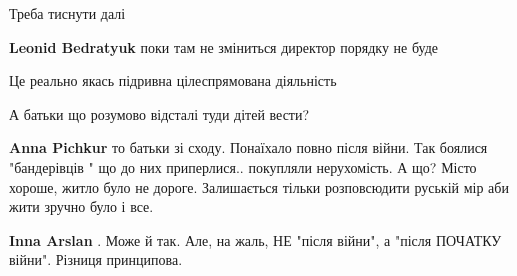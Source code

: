 \begin{itemize}
Треба тиснути далі

\begin{itemize}
 
\textbf{Leonid Bedratyuk} поки там не зміниться директор порядку не буде
\end{itemize}

 
Це реально якась підривна цілеспрямована діяльність

 
А батьки що розумово відсталі туди дітей вести?

\begin{itemize}
 
\textbf{Anna Pichkur} то батьки зі сходу. Понаїхало повно після війни. Так
боялися "бандерівців " що до них приперлися.. покупляли нерухомість. А що?
Місто хороше, житло було не дороге. Залишається тільки розповсюдити руській мір
аби жити зручно було і все.

\begin{itemize}
 
\textbf{Inna Arslan} . Може й так. Але, на жаль, НЕ "після війни", а "після ПОЧАТКУ війни". Різниця принципова.

 

\end{itemize}
\end{itemize}
\end{itemize}
